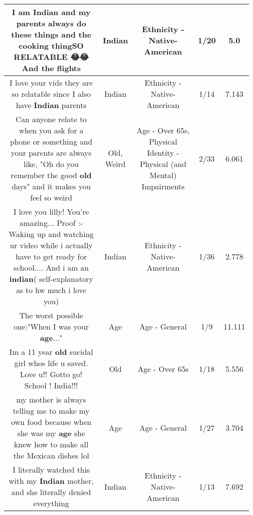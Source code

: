\documentclass[11pt]{article}
\newlength\mylength
\begin{document}
\begin{center}
\begin{longtable}{|C{.65\mylength}|C{.30\mylength}|C{.12\mylength}|C{.12\mylength}|C{.12\mylength}|}
  \small I am \textbf{Indian} and my parents always do these things and the cooking thingSO RELATABLE 😂😂And the flights\normalsize   & Indian & Ethnicity - Native-American & 1/20 & 5.0 \\  \hline
  \small I love your vids they are so relatable since I also have \textbf{Indian} parents\normalsize   & Indian & Ethnicity - Native-American & 1/14 & 7.143 \\  \hline
  \small Can anyone relate to when you ask for a phone or something and your parents are always like, "Oh do you remember the good \textbf{old} days" and it makes you feel so weird\normalsize   & Old, Weird & Age - Over 65s, Physical Identity - Physical (and Mental) Impairments & 2/33 & 6.061 \\  \hline
  \small I love you lilly! You're amazing... Proof :- Waking up and watching ur video while i actually have to get ready for school.... And i am an \textbf{indian}( self-explanatory as to hw much i love you)\normalsize   & Indian & Ethnicity - Native-American & 1/36 & 2.778 \\  \hline
  \small The worst possible one:"When I was your \textbf{age}..."\normalsize   & Age & Age - General & 1/9 & 11.111 \\  \hline
  \small Im a 11 year \textbf{old} sucidal girl whos life u saved. Love u!! Gotto go! School ! India!!!\normalsize   & Old & Age - Over 65s & 1/18 & 5.556 \\  \hline
  \small my mother is always telling me to make my own food because when she was my \textbf{age} she knew how to make all the Mexican dishes lol\normalsize   & Age & Age - General & 1/27 & 3.704 \\  \hline
  \small I literally watched this with my \textbf{Indian} mother, and she literally denied everything\normalsize   & Indian & Ethnicity - Native-American & 1/13 & 7.692 \\  \hline

\end{longtable}
\end{center}
\end{document}

